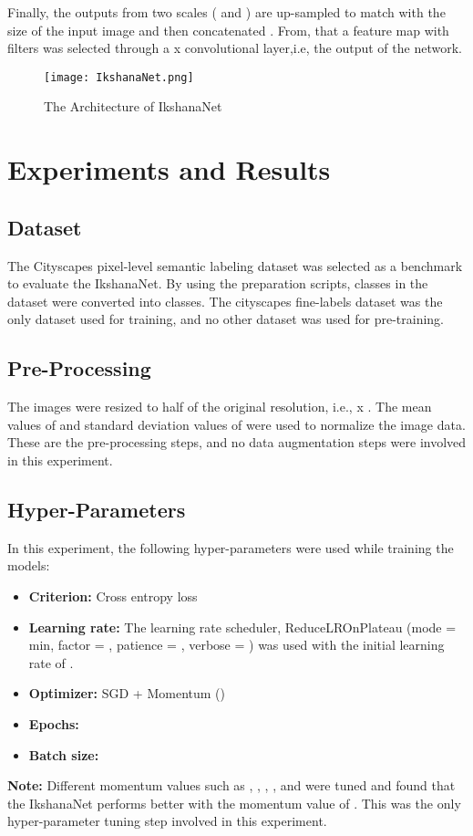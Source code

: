\documentclass{article}
\begin{document}
Finally, the outputs from two scales ( and ) are up-sampled to match with the size of the input image and then concatenated . From, that a feature map with  filters was selected through a x convolutional layer,i.e, the output  of the network. 
\begin{figure}[t]
\begin{center}
   \texttt{[image: IkshanaNet.png]}
\end{center}
   \caption{The Architecture of IkshanaNet}
\label{fig:IkshanaNet}
\end{figure}
\section{Experiments and Results}
\subsection{Dataset}
The Cityscapes\cite{cordts2016cityscapes} pixel-level semantic labeling dataset was selected as a benchmark to evaluate the IkshanaNet. By using the preparation scripts,  classes in the dataset were converted into  classes. The cityscapes fine-labels dataset was the only dataset used for training, and no other dataset was used for pre-training.
\subsection{Pre-Processing}
The images were resized to half of the original resolution, i.e., 
 x . The mean values of  and standard deviation values of  were used to normalize the image data. These are the pre-processing steps, and no data augmentation steps were involved in this experiment.
\subsection{Hyper-Parameters}
In this experiment, the following hyper-parameters were used while training the models:
\begin{itemize}
    \item \textbf{Criterion:} Cross entropy loss
    \item \textbf{Learning rate:} The learning rate scheduler, ReduceLROnPlateau (mode = min, factor = , patience = , verbose = ) was used with the initial learning rate of .
    \item \textbf{Optimizer:} SGD + Momentum ()
    \item \textbf{Epochs:} 
    \item \textbf{Batch size:} 
\end{itemize}
\textbf{Note:} Different momentum values such as , , , , and  were tuned and found that the IkshanaNet performs better with the momentum value of . This was the only hyper-parameter tuning step involved in this experiment. 
\end{document}
